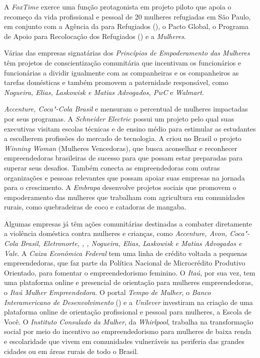 A \emph{FoxTime} exerce uma função protagonista em projeto piloto que
apoia o recomeço da vida profissional e pessoal de 20 mulheres
refugiadas em São Paulo, em conjunto com a Agência da  para
Refugiados (), o Pacto Global, o Programa de Apoio para Recolocação
dos Refugiados () e a \emph{ Mulheres}.

Várias das empresas signatárias dos \emph{Princípios de Empoderamento
das Mulheres} têm projetos de conscientização comunitária que incentivam
os funcionários e funcionárias a dividir igualmente com as companheiras
e os companheiros as tarefas domésticas e também promovem a paternidade
responsável, como \emph{Nogueira, Elias, Laskowisk e Matias Advogados,
PwC} e \emph{Walmart}.

\emph{Accenture, Coca"-Cola Brasil} e \emph{} mensuram o percentual de
mulheres impactadas por seus programas. A \emph{Schneider Electric}
possui um projeto pelo qual suas executivas visitam escolas técnicas e
de ensino médio para estimular as estudantes a escolherem profissões do
mercado de tecnologia. A \emph{} criou no Brasil o projeto
\emph{Winning Woman} (Mulheres Vencedoras), que busca aconselhar e
reconhecer empreendedoras brasileiras de sucesso para que possam estar
preparadas para superar seus desafios. Também conecta as empreendedoras
com outras organizações e pessoas relevantes que possam apoiar suas
empresas na jornada para o crescimento. A \emph{Embrapa} desenvolve
projetos sociais que promovem o empoderamento das mulheres que trabalham
com agricultura em comunidades rurais, como quebradeiras de coco e
catadoras de mangaba.

Algumas empresas já têm ações comunitárias destinadas a combater
diretamente a violência doméstica contra mulheres e crianças, como
\emph{Accenture, Avon, Coca"-Cola Brasil, Eletronorte, , ,
Nogueira, Elias, Laskowisk e Matias Advogados e Vale}. A \emph{Caixa
Econômica Federal} tem uma linha de crédito voltada a pequenas
empreendedoras, que faz parte da Política Nacional de Microcrédito
Produtivo Orientado, para fomentar o empreendedorismo feminino. O
\emph{Itaú}, por sua vez, tem uma plataforma online e presencial de
orientação para mulheres empreendedoras, o \emph{Itaú Mulher
Empreendedora}. O portal \emph{Tempo de Mulher}, o \emph{Banco
Interamericano de Desenvolvimento} () e a \emph{Unilever} investiram
na criação de uma plataforma online de orientação profissional e pessoal
para mulheres, a Escola de Você. O \emph{Instituto Consulado da Mulher},
da \emph{Whirlpool}, trabalha na transformação social por meio do
incentivo ao empreendedorismo para mulheres de baixa renda e
escolaridade que vivem em comunidades vulneráveis na periferia das
grandes cidades ou em áreas rurais de todo o Brasil.

